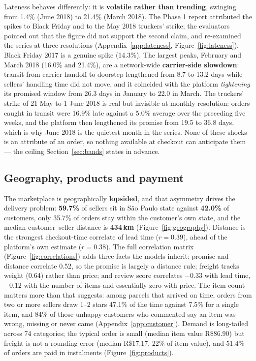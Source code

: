 Lateness behaves differently: it is \textbf{volatile rather than trending},
swinging from 1.4\% (June 2018) to 21.4\% (March 2018). The Phase 1 report
attributed the spikes to Black Friday and to the May 2018 truckers' strike; the
evaluators pointed out that the figure did not support the second claim, and
 re-examined the series at three resolutions
(Appendix~\ref{app:lateness}, Figure~\ref{fig:lateness}). Black Friday 2017 is
a genuine spike (14.3\%). The largest peaks, February and March 2018 (16.0\% and
21.4\%), are a network-wide \textbf{carrier-side slowdown}: transit from carrier
handoff to doorstep lengthened from 8.7 to 13.2 days while sellers' handling
time did not move, and it coincided with the platform \emph{tightening} its
promised window from 26.3 days in January to 22.0 in March. The truckers'
strike of 21 May to 1 June 2018 \citep{bloomberg2018strike,
tecnoblog2018correios} is real but invisible at monthly resolution: orders
caught in transit were 16.9\% late against a 5.0\% average over the preceding
five weeks, and the platform then lengthened its promise from 19.5 to 36.8
days, which is why June 2018 is the quietest month in the series. None of these
shocks is an attribute of an order, so nothing available at checkout can
anticipate them --- the ceiling Section~\ref{sec:bands} states in advance.

\subsection{Geography, products and payment}

The marketplace is geographically \textbf{lopsided}, and that asymmetry drives
the delivery problem: \textbf{59.7\%} of sellers sit in S\~{a}o Paulo state
against \textbf{42.0\%} of customers, only 35.7\% of orders stay within the
customer's own state, and the median customer--seller distance is
\textbf{434\,km} (Figure~\ref{fig:geography}). Distance is the strongest
checkout-time correlate of lead time ($r = 0.39$), ahead of the platform's own
estimate ($r = 0.38$). The full correlation matrix (Figure~\ref{fig:correlations})
adds three facts the models inherit: promise and distance correlate 0.52, so the
promise is largely a distance rule; freight tracks weight (0.64) rather than
price; and review score correlates $-0.33$ with lead time, $-0.12$ with the
number of items and essentially zero with price. The item count matters more
than that suggests: among parcels that arrived on time, orders from two or more
sellers draw 1--2 stars 47.1\% of the time against 7.5\% for a single item, and
84\% of those unhappy customers who commented say an item was wrong, missing or
never came (Appendix~\ref{app:customer}). Demand is long-tailed across 74 categories; the typical order is small (median
item value R\$86.90) but freight is not a rounding error (median R\$17.17, 22\%
of item value), and 51.4\% of orders are paid in instalments
(Figure~\ref{fig:products}).

